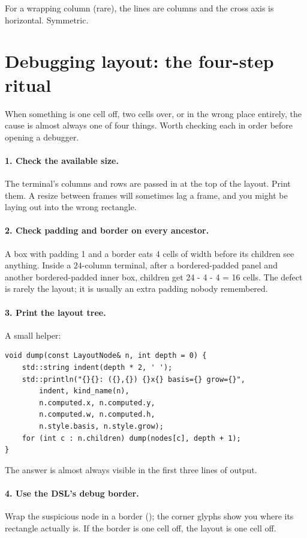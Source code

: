 For a wrapping column (rare), the lines are columns and the cross
axis is horizontal. Symmetric.

\section{Debugging layout: the four-step ritual}
\label{sec:layout:debugging}

When something is one cell off, two cells over, or in the wrong
place entirely, the cause is almost always one of four things.
Worth checking each in order before opening a debugger.

\paragraph{1. Check the available size.} The terminal's columns
and rows are passed in at the top of the layout. Print them. A
resize between frames will sometimes lag a frame, and you might be
laying out into the wrong rectangle.

\paragraph{2. Check padding and border on every ancestor.} A box
with padding 1 and a border eats 4 cells of width before its
children see anything. Inside a $24$-column terminal, after a
bordered-padded panel and another bordered-padded inner box,
children get 24 - 4 - 4 = 16 cells. The defect is rarely the layout;
it is usually an extra padding nobody remembered.

\paragraph{3. Print the layout tree.} A small helper:

\begin{lstlisting}
void dump(const LayoutNode& n, int depth = 0) {
    std::string indent(depth * 2, ' ');
    std::println("{}{}: ({},{}) {}x{} basis={} grow={}",
        indent, kind_name(n),
        n.computed.x, n.computed.y,
        n.computed.w, n.computed.h,
        n.style.basis, n.style.grow);
    for (int c : n.children) dump(nodes[c], depth + 1);
}
\end{lstlisting}

The answer is almost always visible in the first three lines of
output.

\paragraph{4. Use the DSL's debug border.} Wrap the suspicious
node in a border (); the corner glyphs
show you where its rectangle actually is. If the border is one
cell off, the layout is one cell off.

